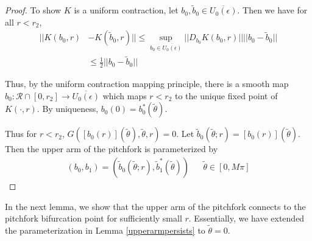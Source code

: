 \documentclass[thesis.tex]{subfiles}
\begin{document}
\begin{lemma}
\begin{proof}
To show $K$ is a uniform contraction, let $b_0, \tilde{b}_0 \in \overline{U_0(\epsilon)}$. Then we have for all $r < r_2$,
\begin{align*}
|| K(b_0, r) &- K(\tilde{b}_0, r) || 
\leq \sup_{b_0 \in \overline{U_0(\epsilon)}}||D_{b_0} K(b_0, r)|| ||b_0 - \tilde{b}_0 || \\
&\leq \frac{1}{2}||b_0 - \tilde{b}_0 ||
\end{align*}

Thus, by the uniform contraction mapping principle, there is a smooth map $b_0 : \mathcal{R} \cap [0, r_2] \rightarrow  \overline{U_0(\epsilon)}$ which maps $r < r_2$ to the unique fixed point of $K(\cdot, r)$. By uniqueness, $b_0(0) = b_0^*(\tilde{\theta})$. 

Thus for $r < r_2$, $G([b_0(r)](\tilde{\theta}), \tilde{\theta}, r) = 0$.
Let $\tilde{b}_0(\tilde{\theta}; r) = [b_0(r)](\tilde{\theta})$. Then the upper arm of the pitchfork is parameterized by
\begin{align*}
(b_0, b_1) = (\tilde{b}_0(\tilde{\theta}; r), \tilde{b}^*_1(\tilde{\theta})) && \tilde{\theta} \in [0, M \pi]
\end{align*}

\end{proof}
\end{lemma} 

In the next lemma, we show that the upper arm of the pitchfork connects to the pitchfork bifurcation point for sufficiently small $r$. Essentially, we have extended the parameterization in Lemma \ref{upperarmpersists} to $\tilde{\theta} = 0$.
\end{document}

